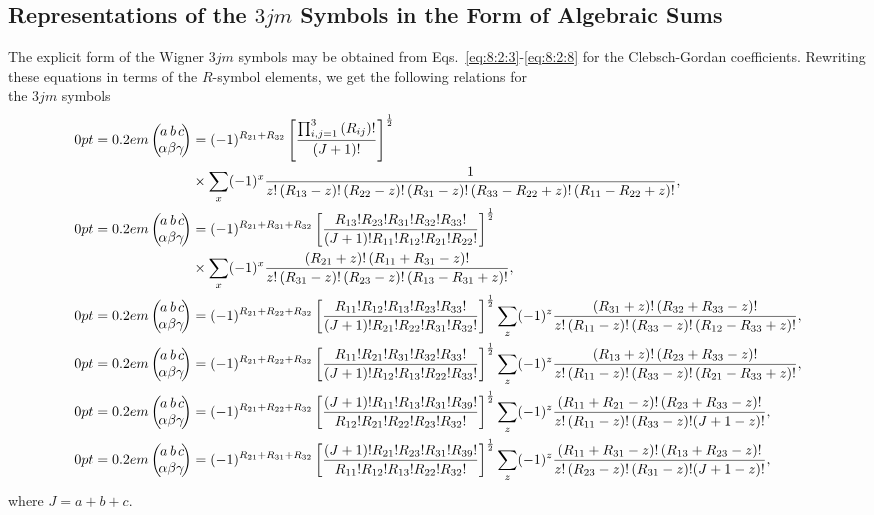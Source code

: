 \subsection{Representations of the $3 j m$ Symbols in the Form of Algebraic Sums}\label{sec:8.2.6}
The explicit form of the Wigner $3 j m$ symbols may be obtained from Eqs.~\eqref{eq:8:2:3}-\eqref{eq:8:2:8} for the Clebsch-Gordan coefficients. Rewriting these equations in terms of the $R$-symbol elements, we get the following relations for\\
the $3 j m$ symbols \cite{ref045}
\begin{align}
 \threej{a}{b}{c}{\alpha}{\beta}{\gamma}&=(-1)^{R_{21}+R_{32}}\left[\frac{\prod_{i, j=1}^{3}\left(R_{i j}\right)!}{(J+1)!}\right]^{\frac{1}{2}} \notag \\
& \times \sum_{x}(-1)^{x} \frac{1}{z!\left(R_{13}-z\right)!\left(R_{22}-z\right)!\left(R_{31}-z\right)!\left(R_{33}-R_{22}+z\right)!\left(R_{11}-R_{22}+z\right)!}, \label{eq:8:2:28}\\
\threej{a}{b}{c}{\alpha}{\beta}{\gamma}&=(-1)^{R_{21}+R_{31}+R_{32}}\left[\frac{R_{13}!R_{23}!R_{31}!R_{32}!R_{33}!}{(J+1)!R_{11}!R_{12}!R_{21}!R_{22}!}\right]^{\frac{1}{2}}  \notag\\
 &\times \sum_{x}(-1)^{x} \frac{\left(R_{21}+z\right)!\left(R_{11}+R_{31}-z\right)!}{z!\left(R_{31}-z\right)!\left(R_{23}-z\right)!\left(R_{13}-R_{31}+z\right)!}, \label{eq:8:2:29}\\
 \threej{a}{b}{c}{\alpha}{\beta}{\gamma}&=(-1)^{R_{21}+R_{22}+R_{32}}\left[\frac{R_{11}!R_{12}!R_{13}!R_{23}!R_{33}!}{(J+1)!R_{21}!R_{22}!R_{31}!R_{32}!}\right]^{\frac{1}{2}} \sum_{z}(-1)^{z} \frac{\left(R_{31}+z\right)!\left(R_{32}+R_{33}-z\right)!}{z!\left(R_{11}-z\right)!\left(R_{33}-z\right)!\left(R_{12}-R_{33}+z\right)!}, \\
 \threej{a}{b}{c}{\alpha}{\beta}{\gamma}&=(-1)^{R_{21}+R_{22}+R_{32}}\left[\frac{R_{11}!R_{21}!R_{31}!R_{32}!R_{33}!}{(J+1)!R_{12}!R_{13}!R_{22}!R_{33}!}\right]^{\frac{1}{2}} \sum_{z}(-1)^{z} \frac{\left(R_{13}+z\right)!\left(R_{23}+R_{33}-z\right)!}{z!\left(R_{11}-z\right)!\left(R_{33}-z\right)!\left(R_{21}-R_{33}+z\right)!}, \label{eq:8:2:31}\\
 \threej{a}{b}{c}{\alpha}{\beta}{\gamma}&=(-1)^{R_{21}+R_{22}+R_{32}}\left[\frac{(J+1)!R_{11}!R_{13}!R_{31}!R_{39}!}{R_{12}!R_{21}!R_{22}!R_{23}!R_{32}!}\right]^{\frac{1}{2}} \sum_{z}(-1)^{z} \frac{\left(R_{11}+R_{21}-z\right)!\left(R_{23}+R_{33}-z\right)!}{z!\left(R_{11}-z\right)!\left(R_{33}-z\right)!(J+1-z)!}, \label{eq:8:2:32}\\
 \threej{a}{b}{c}{\alpha}{\beta}{\gamma}&=(-1)^{R_{21}+R_{31}+R_{32}}\left[\frac{(J+1)!R_{21}!R_{23}!R_{31}!R_{39}!}{R_{11}!R_{12}!R_{13}!R_{22}!R_{32}!}\right]^{\frac{1}{2}} \sum_{z}(-1)^{z} \frac{\left(R_{11}+R_{31}-z\right)!\left(R_{13}+R_{23}-z\right)!}{z!\left(R_{23}-z\right)!\left(R_{31}-z\right)!(J+1-z)!}, \label{eq:8:2:33}
\end{align}
where $J=a+b+c$.

